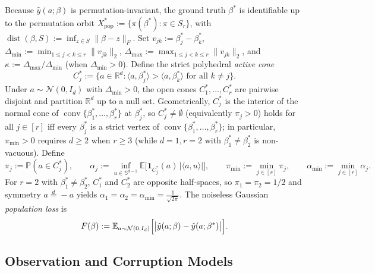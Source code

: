 \documentclass[11pt]{article}
\theoremstyle{plain}
\theoremstyle{remark}
\numberwithin{equation}{section}
\newcommand{\R}{\mathbb{R}}
\newcommand{\E}{\mathbb{E}}
\newcommand{\Prob}{\mathbb{P}}
\newcommand{\Sph}{\mathbb{S}}
\newcommand{\ind}{\mathbf{1}}
\newcommand{\ip}[2]{\langle #1, #2 \rangle}
\newcommand{\norm}[1]{\|#1\|}
\newcommand{\dist}{\operatorname{dist}}
\newcommand{\Fnorm}[1]{\|#1\|_F}
\begin{document}
Because $\hat y(a; \beta)$ is permutation-invariant, the ground truth $\beta^*$ is identifiable up to the permutation orbit $X_{\mathrm{pop}}^* := \{\pi(\beta^*) : \pi \in S_r\}$, with $\dist(\beta, S) := \inf_{z \in S} \Fnorm{\beta - z}$. Set $v_{jk} := \beta_j^* - \beta_k^*$, $\Delta_{\min} := \min_{1 \le j < k \le r} \norm{v_{jk}}_2$, $\Delta_{\max} := \max_{1 \le j < k \le r} \norm{v_{jk}}_2$, and $\kappa := \Delta_{\max}/\Delta_{\min}$ (when $\Delta_{\min} > 0$). Define the strict polyhedral \emph{active cone}
\[
  C_j^* := \bigl\{a \in \R^d : \ip{a}{\beta_j^*} > \ip{a}{\beta_k^*} \text{ for all } k \ne j\bigr\}.
\]
Under $a \sim \mathcal{N}(0, I_d)$ with $\Delta_{\min} > 0$, the open cones $C_1^*, \dots, C_r^*$ are pairwise disjoint and partition $\R^d$ up to a null set. Geometrically, $C_j^*$ is the interior of the normal cone of $\operatorname{conv}\{\beta_1^*, \dots, \beta_r^*\}$ at $\beta_j^*$, so $C_j^* \ne \emptyset$ (equivalently $\pi_j > 0$) holds for all $j \in [r]$ iff every $\beta_j^*$ is a strict vertex of $\operatorname{conv}\{\beta_1^*, \dots, \beta_r^*\}$; in particular, $\pi_{\min} > 0$ requires $d \ge 2$ when $r \ge 3$ (while $d = 1, r = 2$ with $\beta_1^* \ne \beta_2^*$ is non-vacuous). Define
\begin{equation}
  \label{eq:cone-moduli}
  \pi_j := \Prob(a \in C_j^*),
  \qquad
  \alpha_j := \inf_{u \in \Sph^{d-1}} \E\bigl[\ind_{C_j^*}(a)\,|\ip{a}{u}|\bigr],
  \qquad
  \pi_{\min} := \min_{j \in [r]} \pi_j,
  \qquad
  \alpha_{\min} := \min_{j \in [r]} \alpha_j.
\end{equation}
For $r = 2$ with $\beta_1^* \ne \beta_2^*$, $C_1^*$ and $C_2^*$ are opposite half-spaces, so $\pi_1 = \pi_2 = 1/2$ and symmetry $a \stackrel{d}{=} -a$ yields $\alpha_1 = \alpha_2 = \alpha_{\min} = \frac{1}{\sqrt{2\pi}}$. The noiseless Gaussian \emph{population loss} is
\begin{equation}
  \label{eq:pop-loss}
  F(\beta) := \E_{a \sim \mathcal{N}(0, I_d)}\Bigl[\bigl|\hat y(a; \beta) - \hat y(a; \beta^*)\bigr|\Bigr].
\end{equation}

\subsection{Observation and Corruption Models}
\label{sec:corruption-models}
\end{document}
